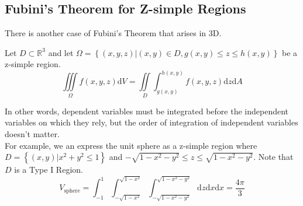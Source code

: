 \subsection{Fubini's Theorem for Z-simple Regions}
\noindent
There is another case of Fubini’s Theorem that arises in 3D.\\
\begin{theorem}
	Let $D\subset\mathbb{R}^3$ and let $\Omega=\left\{(x,y,z)|(x,y)\in D, g(x,y)\leq z\leq h(x,y)\right\}$ be a z-simple region.\\
	$$\iiint\limits_{\Omega}{f(x,y,z)\mathrm{d}V}=\iint\limits_{D}{\int_{g(x,y)}^{h(x,y)}{f(x,y,z)\mathrm{d}z}\mathrm{d}A}$$
\end{theorem}

\noindent
In other words, dependent variables must be integrated before the independent variables on which they rely, but the order of integration of independent variables doesn't matter.\\

\noindent
For example, we an express the unit sphere as a z-simple region where $D=\left\{(x,y)|x^2+y^2\leq 1\right\}$ and $-\sqrt{1-x^2-y^2}\leq z\leq\sqrt{1-x^2-y^2}$. Note that $D$ is a Type I Region.\\
$$V_{\text{sphere}}=\int_{-1}^{1}{\int_{-\sqrt{1-x^2}}^{\sqrt{1-x^2}}{\int_{-\sqrt{1-x^2-y^2}}^{\sqrt{1-x^2-y^2}}{\mathrm{d}z}\mathrm{d}x}\mathrm{d}x}=\frac{4\pi}{3}$$